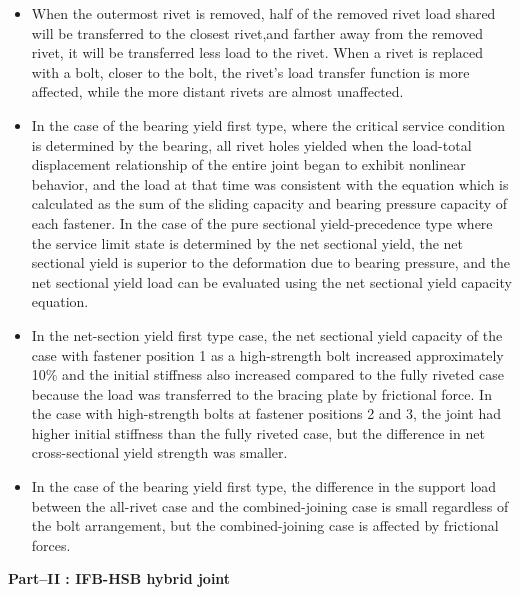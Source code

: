 \begin{itemize}

    \item When the outermost rivet is removed, half of the removed rivet load shared will be transferred to the closest rivet,and farther away from the removed rivet, it will be transferred less load to the rivet. When a rivet is replaced with a bolt, closer to the bolt, the rivet's load transfer function is more affected, while the more distant rivets are almost unaffected.

    \item In the case of the bearing yield first type, where the critical service condition is determined by the bearing, all rivet holes yielded when the load-total displacement relationship of the entire joint began to exhibit nonlinear behavior, and the load at that time was consistent with the equation which is calculated as the sum of the sliding capacity and bearing pressure capacity of each fastener. In the case of the pure sectional yield-precedence type where the service limit state is determined by the net sectional yield, the net sectional yield is superior to the deformation due to bearing pressure, and the net sectional yield load can be evaluated using the net sectional yield capacity equation.

    \item  In the net-section yield first type case, the net sectional yield capacity of the case with fastener position 1 as a high-strength bolt increased approximately 10\% and the initial stiffness also increased compared to the fully riveted case because the load was transferred to the bracing plate by frictional force. In the case with high-strength bolts at fastener positions 2 and 3, the joint had higher initial stiffness than the fully riveted case, but the difference in net cross-sectional yield strength was smaller.

    \item In the case of the bearing yield first type, the difference in the support load between the all-rivet case and the combined-joining case is small regardless of the bolt arrangement, but the combined-joining case is affected by frictional forces.

\end{itemize}


\textbf{Part--\RN{2} : IFB-HSB hybrid joint}


